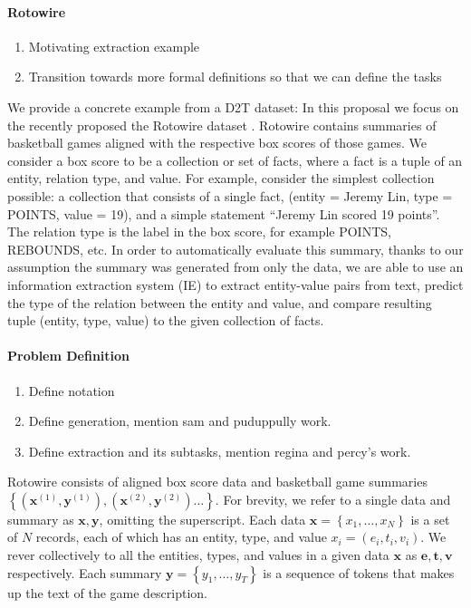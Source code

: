 \documentclass[11pt]{article}
\newcommand\set[1]{\left\{#1\right\}}
\newcommand{\be}{\mathbf{e}}
\newcommand{\bt}{\mathbf{t}}
\newcommand{\bv}{\mathbf{v}}
\newcommand{\bx}{\mathbf{x}}
\newcommand{\by}{\mathbf{y}}
\begin{document}
\paragraph{Rotowire}
\begin{enumerate}
\item Motivating extraction example
\item Transition towards more formal definitions so that we can define the tasks
\end{enumerate}
We provide a concrete example from a D2T dataset:
In this proposal we focus on the recently proposed
the Rotowire dataset \citep{wiseman2017d2t}.
Rotowire contains summaries of basketball games aligned with the respective
box scores of those games.
We consider a box score to be a collection or set of facts,
where a fact is a tuple of an entity, relation type, and value.
For example, consider the simplest collection possible:
a collection that consists of a single fact, (entity = Jeremy Lin, type = POINTS, value = 19),
and a simple statement ``Jeremy Lin scored 19 points''.
The relation type is the label in the box score, for example POINTS, REBOUNDS, etc.
In order to automatically evaluate this summary,
thanks to our assumption the summary was generated from only the data,
we are able to use an information extraction system (IE) to extract entity-value pairs
from text,
predict the type of the relation between the entity and value,
and compare resulting tuple (entity, type, value) to the given collection of facts.

\paragraph{Problem Definition}
\begin{enumerate}
\item Define notation
\item Define generation, mention sam and puduppully work.
\item Define extraction and its subtasks, mention regina and percy's work.
\end{enumerate}
Rotowire consists of aligned box score data and basketball game summaries
$\set{(\bx^{(1)}, \by^{(1)}),(\bx^{(2)},\by^{(2)})\ldots}$.
For brevity, we refer to a single data and summary as $\bx,\by$, omitting the superscript.
Each data $\bx = \set{x_1,\ldots,x_N}$ is a set of $N$ records, each of which has
an entity, type, and value $x_i = (e_i, t_i, v_i)$.
We rever collectively to all the entities, types, and values in a given data $\bx$ as
$\be,\bt,\bv$ respectively.
Each summary $\by = \set{y_1,\ldots,y_T}$ is a sequence of tokens that makes up the
text of the game description.
\end{document}
